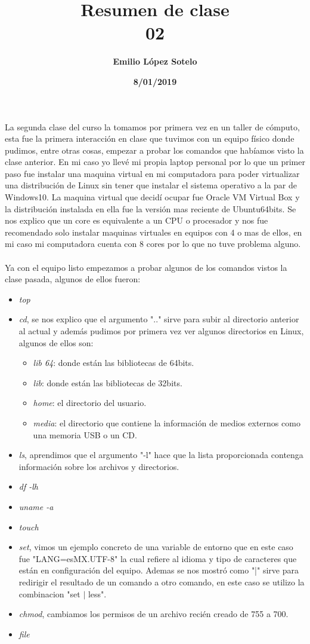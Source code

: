 \documentclass[letterpaper, 12pt, oneside]{article}
\title{\Huge \textbf{Resumen de clase\\02}}
\author{\textbf{Emilio López Sotelo}}
\date{\textbf{8/01/2019}}
\begin{document}
	\maketitle
	La segunda clase del curso la tomamos por primera vez en un taller de cómputo, esta fue la primera interacción en clase que tuvimos con un equipo físico donde pudimos, entre otras cosas, empezar a probar los comandos que habíamos visto la clase anterior. En mi caso yo llevé mi propia laptop personal por lo que un primer paso fue instalar una maquina virtual en mi computadora para poder virtualizar una distribución de Linux sin tener que instalar el sistema operativo a la par de Windows10. La maquina virtual que decidí ocupar fue Oracle VM Virtual Box y la distribución instalada en ella fue la versión mas reciente de Ubuntu64bits. Se nos explico que un core es equivalente a un CPU o procesador y nos fue recomendado solo instalar maquinas virtuales en equipos con 4 o mas de ellos, en mi caso mi computadora cuenta con 8 cores por lo que no tuve problema alguno.
	\\
	\\
	Ya con el equipo listo empezamos a probar algunos de los comandos vistos la clase pasada, algunos de ellos fueron:
	\begin{itemize}
		\item \textit{top}
		\item \textit{cd}, se nos explico que el argumento ".." sirve para subir al directorio anterior al actual y además pudimos por primera vez ver algunos directorios en Linux, algunos de ellos son:
		\begin{itemize} 
			\item \textit{lib 64}: donde están las bibliotecas de 64bits.
			\item \textit{lib}: donde están las bibliotecas de 32bits.
			\item \textit{home}: el directorio del usuario.
			\item \textit{media}: el directorio que contiene la información de medios externos como una memoria USB o un CD.
		\end{itemize}
		\item \textit{ls}, aprendimos que el argumento "-l" hace que la lista proporcionada contenga información sobre los archivos y directorios.
		\item \textit{df -lh}
		\item \textit{uname -a}
		\item \textit{touch}
		\item \textit{set}, vimos un ejemplo concreto de una variable de entorno que en este caso fue "LANG=esMX.UTF-8" la cual refiere al idioma y tipo de caracteres que están en configuración del equipo. Ademas se nos mostró como "|" sirve para redirigir el resultado de un comando a otro comando, en este caso se utilizo la combinacion "set $|$ less".
		\item \textit{chmod}, cambiamos los permisos de un archivo recién creado de 755 a 700.
		\item \textit{file}
		\
	\end{itemize}
\end{document}
